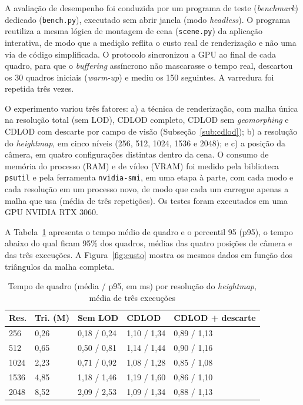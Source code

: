 \documentclass[conference]{IEEEtran}
\newcommand{\fonte}[1]{\par\vspace{2pt}{\footnotesize Fonte: #1\par}}
\begin{document}
A avaliação de desempenho foi conduzida por um programa de teste
(\emph{benchmark}) dedicado (\texttt{bench.py}), executado sem abrir janela
(modo \emph{headless}). O programa reutiliza a mesma lógica de montagem de
cena (\texttt{scene.py}) da aplicação interativa, de modo que a medição
reflita o custo real de renderização e não uma via de código simplificada.
O protocolo sincronizou a GPU ao final de cada quadro, para que o
\emph{buffering} assíncrono não mascarasse o tempo real, descartou os 30
quadros iniciais (\emph{warm-up}) e mediu os 150 seguintes. A varredura foi
repetida três vezes.

O experimento variou três fatores: a) a técnica de renderização, com malha única na resolução total (sem LOD), CDLOD completo, CDLOD sem \emph{geomorphing} e CDLOD com descarte por campo de visão (Subseção~\ref{sub:cdlod}); b) a resolução do
\emph{heightmap}, em cinco níveis (256, 512, 1024, 1536 e 2048); e c) a
posição da câmera, em quatro configurações distintas dentro da cena. O consumo de memória do processo (RAM) e de vídeo (VRAM) foi medido pela biblioteca \texttt{psutil} e pela ferramenta \texttt{nvidia-smi}, em uma etapa à parte, com cada modo e cada resolução em um processo novo, de modo que cada um carregue apenas a malha que usa (média de três repetições). Os testes foram executados em uma GPU NVIDIA RTX 3060.

A Tabela~\ref{tab:tempos} apresenta o tempo médio de quadro e o percentil
95 (p95), o tempo abaixo do qual ficam 95\% dos quadros, médias das quatro
posições de câmera e das três execuções. A Figura~\ref{fig:custo} mostra os
mesmos dados em função dos triângulos da malha completa.

\begin{table}[t]
\caption{Tempo de quadro (média / p95, em ms) por resolução do \emph{heightmap}, média de três execuções}
\label{tab:tempos}
\centering
\small
\setlength{\tabcolsep}{3pt}
\begin{tabular}{@{}p{0.9cm}p{1.2cm}p{1.8cm}p{1.8cm}p{1.9cm}@{}}
\toprule
\textbf{Res.} & \textbf{Tri. (M)} & \textbf{Sem LOD} & \textbf{CDLOD} & \textbf{CDLOD + descarte} \\
\midrule
256  & 0,26 & 0,18 / 0,24 & 1,10 / 1,34 & 0,89 / 1,13 \\
512  & 0,65 & 0,50 / 0,81 & 1,14 / 1,44 & 0,90 / 1,16 \\
1024 & 2,23 & 0,71 / 0,92 & 1,08 / 1,28 & 0,85 / 1,08 \\
1536 & 4,85 & 1,18 / 1,46 & 1,19 / 1,60 & 0,86 / 1,10 \\
2048 & 8,52 & 2,09 / 2,53 & 1,09 / 1,34 & 0,88 / 1,13 \\
\bottomrule
\end{tabular}
\fonte{Elaborado pelos autores (2026), com dados do teste de desempenho. Os
triângulos incluem a água (plano fixo de 130\,050 triângulos e 480 u.m. de lado, maior que o terreno, igual em todas as condições). O CDLOD desenha cerca de 0,43 milhão de
triângulos por quadro (0,26 com descarte).}
\end{table}
\end{document}
